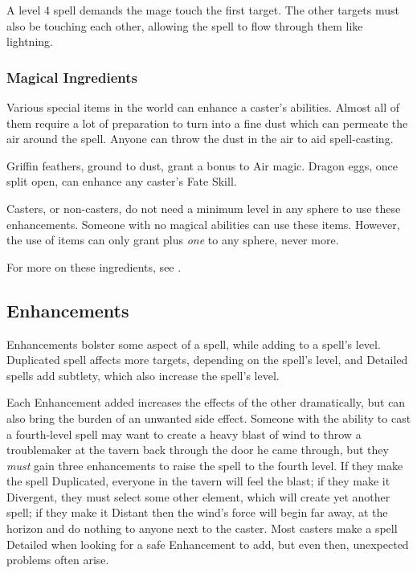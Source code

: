 \begin{multicols}{2}
A level 4 spell demands the mage touch the first target.
The other targets must also be touching each other, allowing the spell to flow through them like lightning.

\subsubsection{Magical Ingredients}

Various special items in the world can enhance a caster's abilities.
Almost all of them require a lot of preparation to turn into a fine dust which can permeate the air around the spell.
Anyone can throw the dust in the air to aid spell-casting.

Griffin feathers, ground to dust, grant a bonus to Air magic.
Dragon eggs, once split open, can enhance any caster's Fate Skill.

Casters, or non-casters, do not need a minimum level in any sphere to use these enhancements.
Someone with no magical abilities can use these items.
However, the use of items can only grant plus \emph{one} to any sphere, never more.

For more on these ingredients, see .

\subsection{Enhancements}

Enhancements bolster some aspect of a spell, while adding to a spell's level.
Duplicated spell affects more targets, depending on the spell's level, and Detailed spells add subtlety, which also increase the spell's level.

Each Enhancement added increases the effects of the other dramatically, but can also bring the burden of an unwanted side effect.
Someone with the ability to cast a fourth-level spell may want to create a heavy blast of wind to throw a troublemaker at the tavern back through the door he came through, but they \emph{must} gain three enhancements to raise the spell to the fourth level. 
If they make the spell Duplicated, everyone in the tavern will feel the blast; if they make it Divergent, they must select some other element, which will create yet another spell; if they make it Distant then the wind's force will begin far away, at the horizon and do nothing to anyone next to the caster.
Most casters make a spell Detailed when looking for a safe Enhancement to add, but even then, unexpected problems often arise.


\end{multicols}
